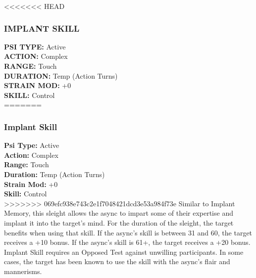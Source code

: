 <<<<<<< HEAD \subsubsection{IMPLANT SKILL} \textbf{PSI TYPE:} Active \\ \textbf{ACTION:} Complex \\ \textbf{RANGE:} Touch \\ \textbf{DURATION:} Temp (Action Turns) \\ \textbf{STRAIN MOD:} +0 \\ \textbf{SKILL:} Control\\ ======= \subsubsection{Implant Skill} \textbf{Psi Type:} Active \\ \textbf{Action:} Complex \\ \textbf{Range:} Touch \\ \textbf{Duration:} Temp (Action Turns) \\ \textbf{Strain Mod:} +0 \\ \textbf{Skill:} Control\\ >>>>>>> 069efc938e743c2e1f7048421dcd3e53a984f73e Similar to Implant Memory, this sleight allows the async to impart some of their expertise and implant it into the target’s mind. For the duration of the sleight, the target benefits when using that skill. If the async’s skill is between 31 and 60, the target receives a +10 bonus. If the async’s skill is 61+, the target receives a +20 bonus. Implant Skill requires an Opposed Test against unwilling participants. In some cases, the target has been known to use the skill with the async’s flair and mannerisms. 

